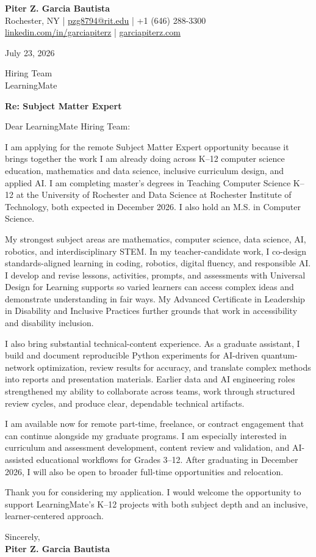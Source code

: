 \documentclass[11pt,letterpaper]{article}
\begin{document}
\textbf{\Large Piter Z. Garcia Bautista}\\
Rochester, NY \enspace|\enspace
\href{mailto:pzg8794@rit.edu}{pzg8794@rit.edu} \enspace|\enspace
+1 (646) 288-3300\\
\href{https://linkedin.com/in/garciapiterz}{linkedin.com/in/garciapiterz}
\enspace|\enspace
\href{https://garciapiterz.com}{garciapiterz.com}

\vspace{10pt}
July 23, 2026

Hiring Team\\
LearningMate

\textbf{Re: Subject Matter Expert}

Dear LearningMate Hiring Team:

I am applying for the remote Subject Matter Expert opportunity because it
brings together the work I am already doing across K--12 computer science
education, mathematics and data science, inclusive curriculum design, and
applied AI. I am completing master's degrees in Teaching Computer Science
K--12 at the University of Rochester and Data Science at Rochester Institute
of Technology, both expected in December 2026. I also hold an M.S. in Computer
Science.

My strongest subject areas are mathematics, computer science, data science,
AI, robotics, and interdisciplinary STEM. In my teacher-candidate work, I
co-design standards-aligned learning in coding, robotics, digital fluency, and
responsible AI. I develop and revise lessons, activities, prompts, and
assessments with Universal Design for Learning supports so varied learners can
access complex ideas and demonstrate understanding in fair ways. My Advanced
Certificate in Leadership in Disability and Inclusive Practices further
grounds that work in accessibility and disability inclusion.

I also bring substantial technical-content experience. As a graduate
assistant, I build and document reproducible Python experiments for AI-driven
quantum-network optimization, review results for accuracy, and translate
complex methods into reports and presentation materials. Earlier data and AI
engineering roles strengthened my ability to collaborate across teams, work
through structured review cycles, and produce clear, dependable technical
artifacts.

I am available now for remote part-time, freelance, or contract engagement
that can continue alongside my graduate programs. I am especially interested
in curriculum and assessment development, content review and validation, and
AI-assisted educational workflows for Grades 3--12. After graduating in
December 2026, I will also be open to broader full-time opportunities and
relocation.

Thank you for considering my application. I would welcome the opportunity to
support LearningMate's K--12 projects with both subject depth and an
inclusive, learner-centered approach.

Sincerely,\\
\textbf{Piter Z. Garcia Bautista}
\end{document}
